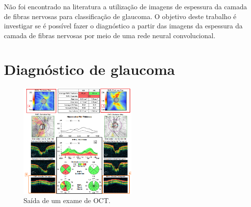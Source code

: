 \documentclass[conference]{IEEEtran}
\begin{document}
Não foi encontrado na literatura a utilização de imagens de espessura da camada de fibras nervosas para classificação de glaucoma. O objetivo deste trabalho é investigar se é possível fazer o diagnóstico a partir das imagens da espessura da camada de fibras nervosas por meio de uma rede neural convolucional.

\section{Diagnóstico de glaucoma}


\begin{figure}[!tp]
  \centering
  \includegraphics[width=2.3in]{img/oct_regiao.png}
  \caption{Saída de um exame de OCT.}
  \label{fig:oct}
\end{figure}
\end{document}
